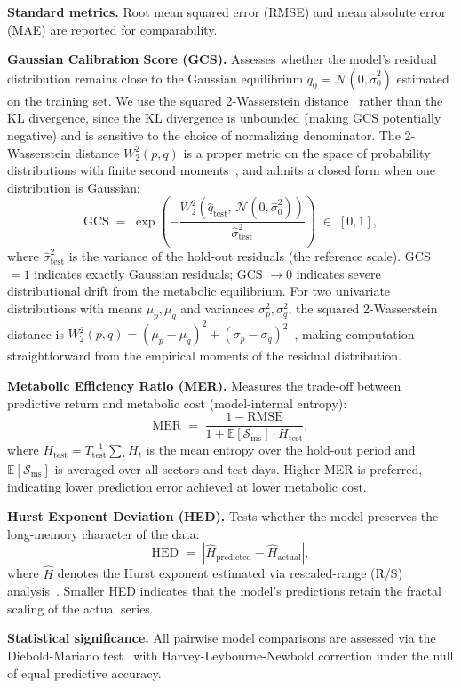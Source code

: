 \documentclass[11pt,a4paper]{article}  %
\newcommand{\E}{\mathbb{E}}
\newcommand{\Ssal}{\mathcal{S}_{\mathrm{ms}}}
\newcommand{\abs}[1]{\left\lvert#1\right\rvert}
\theoremstyle{plain}
\theoremstyle{definition}
\theoremstyle{remark}
\begin{document}
\textbf{Standard metrics.} Root mean squared error (RMSE) and mean
absolute error (MAE) are reported for comparability.

\textbf{Gaussian Calibration Score (GCS).} Assesses whether the
model's residual distribution remains close to the Gaussian
equilibrium $q_0 = \mathcal{N}(0,\hat{\sigma}^2_0)$ estimated on the
training set. We use the squared 2-Wasserstein distance~\cite{Villani2009}
rather than the KL divergence, since the KL divergence is unbounded
(making GCS potentially negative) and is sensitive to the choice of
normalizing denominator. The 2-Wasserstein distance $W_2^2(p,q)$ is a
proper metric on the space of probability distributions with finite
second moments~\cite{Villani2009}, and admits a closed form when one
distribution is Gaussian:
\[
   \mathrm{GCS}
   \;=\; \exp\!\left(
   -\frac{W_2^2\!\left(\hat{q}_{\mathrm{test}},\,
   \mathcal{N}(0,\hat{\sigma}^2_0)\right)}
   {\hat{\sigma}^2_{\mathrm{test}}}\right) \;\in\;[0,1],
\]
where $\hat{\sigma}^2_{\mathrm{test}}$ is the variance of the hold-out
residuals (the reference scale). GCS $= 1$ indicates exactly Gaussian
residuals; GCS $\to 0$ indicates severe distributional drift from the
metabolic equilibrium. For two univariate distributions with means
$\mu_p, \mu_q$ and variances $\sigma^2_p, \sigma^2_q$, the squared
2-Wasserstein distance is
$W_2^2(p,q) = (\mu_p - \mu_q)^2 + (\sigma_p - \sigma_q)^2$~\cite{Villani2009},
making computation straightforward from the empirical moments of
the residual distribution.

\textbf{Metabolic Efficiency Ratio (MER).} Measures the trade-off
between predictive return and metabolic cost (model-internal entropy):
\[
   \mathrm{MER}
   \;=\; \frac{1 - \mathrm{RMSE}}
              {1 + \E[\Ssal]\cdot H_{\mathrm{test}}},
\]
where $H_{\mathrm{test}} = T_{\mathrm{test}}^{-1}\sum_t H_t$ is the
mean entropy over the hold-out period and $\E[\Ssal]$ is averaged
over all sectors and test days. Higher MER is preferred, indicating
lower prediction error achieved at lower metabolic cost.

\textbf{Hurst Exponent Deviation (HED).} Tests whether the model
preserves the long-memory character of the data:
\[
   \mathrm{HED}
   \;=\; \abs{\hat{H}_{\mathrm{predicted}} - \hat{H}_{\mathrm{actual}}},
\]
where $\hat{H}$ denotes the Hurst exponent estimated via rescaled-range
(R/S) analysis~\cite{Hurst1951}. Smaller HED indicates that the
model's predictions retain the fractal scaling of the actual series.

\textbf{Statistical significance.} All pairwise model comparisons
are assessed via the Diebold-Mariano test~\cite{Diebold1995} with
Harvey-Leybourne-Newbold correction under the null of equal
predictive accuracy.
\end{document}
